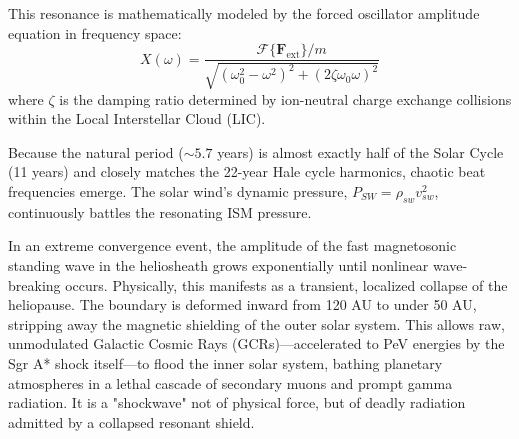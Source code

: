\documentclass[12pt,a4paper]{article}
\begin{document}
This resonance is mathematically modeled by the forced oscillator amplitude equation in frequency space:
\begin{equation}
    X(\omega) = \frac{\mathcal{F}\{\mathbf{F}_{\text{ext}}\}/m}{\sqrt{(\omega_0^2 - \omega^2)^2 + (2\zeta\omega_0\omega)^2}}
\end{equation}
where $\zeta$ is the damping ratio determined by ion-neutral charge exchange collisions within the Local Interstellar Cloud (LIC). 

Because the natural period ($\sim 5.7$ years) is almost exactly half of the Solar Cycle (11 years) and closely matches the 22-year Hale cycle harmonics, chaotic beat frequencies emerge. The solar wind's dynamic pressure, $P_{SW} = \rho_{sw} v_{sw}^2$, continuously battles the resonating ISM pressure. 

In an extreme convergence event, the amplitude of the fast magnetosonic standing wave in the heliosheath grows exponentially until nonlinear wave-breaking occurs. Physically, this manifests as a transient, localized collapse of the heliopause. The boundary is deformed inward from 120 AU to under 50 AU, stripping away the magnetic shielding of the outer solar system. This allows raw, unmodulated Galactic Cosmic Rays (GCRs)—accelerated to PeV energies by the Sgr A* shock itself—to flood the inner solar system, bathing planetary atmospheres in a lethal cascade of secondary muons and prompt gamma radiation. It is a "shockwave" not of physical force, but of deadly radiation admitted by a collapsed resonant shield.
\end{document}
